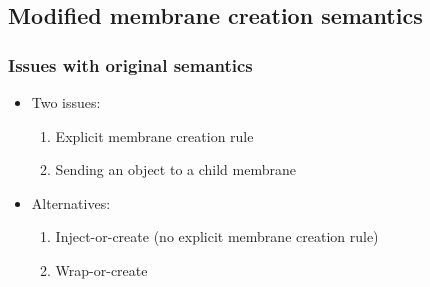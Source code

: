 
  \subsection{Modified membrane creation semantics} %
  \label{sub:modified_membrane_creation_semantics}

    \begin{frame}[t]\frametitle{Issues with original semantics}
      \begin{itemize}
        \item Two issues:
        \begin{enumerate}
          \item Explicit membrane creation rule
          \pause
          \item Sending an object to a child membrane
        \end{enumerate}
        \pause
        \item Alternatives:
        \begin{enumerate}
          \item Inject-or-create (no explicit membrane creation rule)
          \pause
          \item Wrap-or-create
        \end{enumerate}
      \end{itemize}
    \end{frame}
    \note{}


